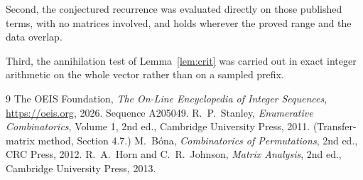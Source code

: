 \documentclass[11pt,a4paper]{article}
\theoremstyle{plain}
\theoremstyle{definition}
\begin{document}
Second, the conjectured recurrence was evaluated directly on those published terms, with no
matrices involved, and holds wherever the proved range and the data overlap.

Third, the annihilation test of Lemma~\ref{lem:crit} was carried out in exact integer
arithmetic on the whole vector rather than on a sampled prefix.

\begin{thebibliography}{9}
 The OEIS Foundation, \emph{The On-Line Encyclopedia of Integer
Sequences}, \url{https://oeis.org}, 2026. Sequence A205049.
 R.~P.~Stanley, \emph{Enumerative Combinatorics}, Volume 1, 2nd ed.,
Cambridge University Press, 2011. (Transfer-matrix method, Section 4.7.)
 M.~B\'ona, \emph{Combinatorics of Permutations}, 2nd ed., CRC
Press, 2012.
 R.~A.~Horn and C.~R.~Johnson, \emph{Matrix Analysis}, 2nd ed., Cambridge
University Press, 2013.
\end{thebibliography}
\end{document}
